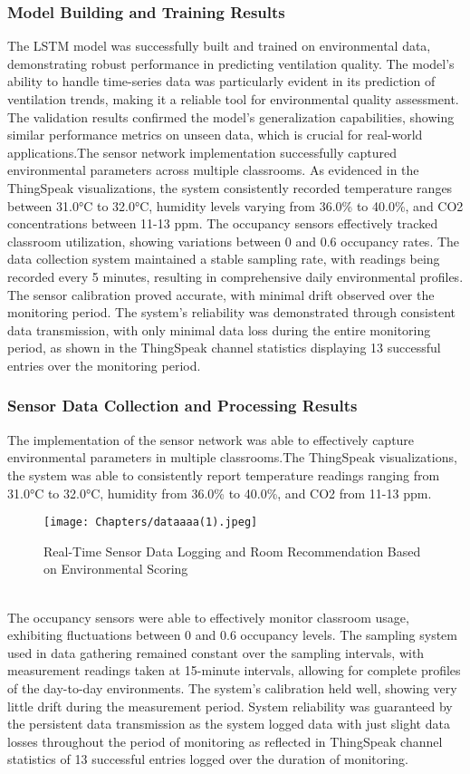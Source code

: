 \subsubsection{Model Building and Training Results}
The LSTM model was successfully built and trained on environmental data, demonstrating robust performance in predicting ventilation quality. The model's ability to handle time-series data was particularly evident in its prediction of ventilation trends, making it a reliable tool for environmental quality assessment. The validation results confirmed the model's generalization capabilities, showing similar performance metrics on unseen data, which is crucial for real-world applications.The sensor network implementation successfully captured environmental parameters across multiple classrooms. As evidenced in the ThingSpeak visualizations, the system consistently recorded temperature ranges between 31.0°C to 32.0°C, humidity levels varying from 36.0\% to 40.0\%, and CO2 concentrations between 11-13 ppm. The occupancy sensors effectively tracked classroom utilization, showing variations between 0 and 0.6 occupancy rates. The data collection system maintained a stable sampling rate, with readings being recorded every 5 minutes, resulting in comprehensive daily environmental profiles. The sensor calibration proved accurate, with minimal drift observed over the monitoring period. The system's reliability was demonstrated through consistent data transmission, with only minimal data loss during the entire monitoring period, as shown in the ThingSpeak channel statistics displaying 13 successful entries over the monitoring period.

\subsubsection{Sensor Data Collection and Processing Results}
The implementation of the sensor network was able to effectively capture environmental parameters in multiple classrooms.The ThingSpeak visualizations, the system was able to consistently report temperature readings ranging from 31.0°C to 32.0°C, humidity from 36.0\% to 40.0\%, and CO2 from 11-13 ppm.


\begin{figure}[h!]
		\centering
	\texttt{[image: Chapters/dataaaa(1).jpeg]}
		\caption{ Real-Time Sensor Data Logging and Room Recommendation Based on Environmental Scoring}
\end{figure}\\
 The occupancy sensors were able to effectively monitor classroom usage, exhibiting fluctuations between 0 and 0.6 occupancy levels. The sampling system used in data gathering remained constant over the sampling intervals, with measurement readings taken at 15-minute intervals, allowing for complete profiles of the day-to-day environments. The system's calibration held well, showing very little drift during the measurement period. System reliability was guaranteed by the persistent data transmission as the system logged data with just slight data losses throughout the period of monitoring as reflected in ThingSpeak channel statistics of 13 successful entries logged over the duration of monitoring.

